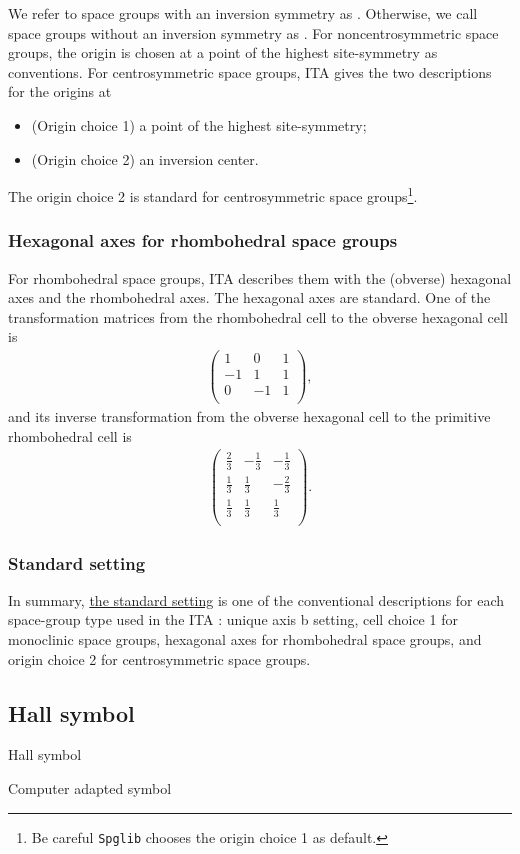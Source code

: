 We refer to space groups with an inversion symmetry as .
Otherwise, we call space groups without an inversion symmetry as .
For noncentrosymmetric space groups, the origin is chosen at a point of the highest site-symmetry as conventions.
For centrosymmetric space groups, ITA gives the two descriptions for the origins at
\begin{itemize}
  \item (Origin choice 1) a point of the highest site-symmetry;
  \item (Origin choice 2) an inversion center.
\end{itemize}
The origin choice 2 is standard for centrosymmetric space groups\footnote{
  Be careful \texttt{Spglib} chooses the origin choice 1 as default.
}.

\subsubsection{Hexagonal axes for rhombohedral space groups}

For rhombohedral space groups, ITA describes them with the (obverse) hexagonal axes and the rhombohedral axes.
The hexagonal axes are standard.
One of the transformation matrices from the rhombohedral cell to the obverse hexagonal cell is
\begin{align*}
  \begin{pmatrix}
    1 & 0 & 1 \\
    -1 & 1 & 1 \\
    0 & -1 & 1 \\
  \end{pmatrix},
\end{align*}
and its inverse transformation from the obverse hexagonal cell to the primitive rhombohedral cell is
\begin{align*}
  \begin{pmatrix}
    \frac{2}{3} & -\frac{1}{3} & -\frac{1}{3} \\
    \frac{1}{3} & \frac{1}{3} & -\frac{2}{3} \\
    \frac{1}{3} & \frac{1}{3} & \frac{1}{3} \\
  \end{pmatrix}.
\end{align*}

\subsubsection{Standard setting}

In summary, \href{https://www.cryst.ehu.es/cgi-bin/cryst/programs/nph-def-choice}{the standard setting} is one of the conventional descriptions for each space-group type used in the ITA \cite{ITA2016}: unique axis b setting, cell choice 1 for monoclinic space groups, hexagonal axes for rhombohedral space groups, and origin choice 2 for centrosymmetric space groups.

\subsection{Hall symbol}

Hall symbol \cite{Hall:a19707}

Computer adapted symbol
